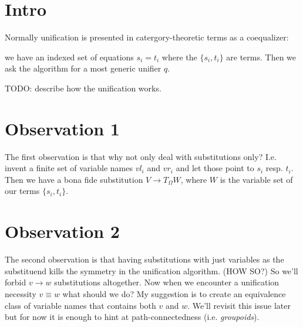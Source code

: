 \documentclass{article}
\begin{document}
\section {Intro}
Normally unification is presented in catergory-theoretic terms as a coequalizer:

we have an indexed set of equations $s_i = t_i$ where the $\{s_i, t_i\}$ are terms.
Then we ask the algorithm for a most generic unifier $q$.

TODO: describe how the unification works.

\section {Observation 1}
The first observation is that why not only deal with substitutions only? I.e. invent a finite set of variable names $vl_i$ and $vr_i$ and let those point to $s_i$ resp. $t_i$. Then we have a bona fide substitution $V \to T_{\Omega}W$, where $W$ is the variable set of our terms $\{s_i, t_i\}$.

\section {Observation 2}
The second observation is that having substitutions with just variables as the substituend kills the symmetry in the unification algorithm. (HOW SO?) So we'll forbid $v \to w$ substitutions altogether. Now when we encounter a unification necessity $v \equiv w$ what should we do?
My suggestion is to create an equivalence class of variable names that contains both $v$ and $w$. We'll revisit this issue later but for now it is enough to hint at path-connectedness (i.e. \emph{groupoids}).
\end{document}
